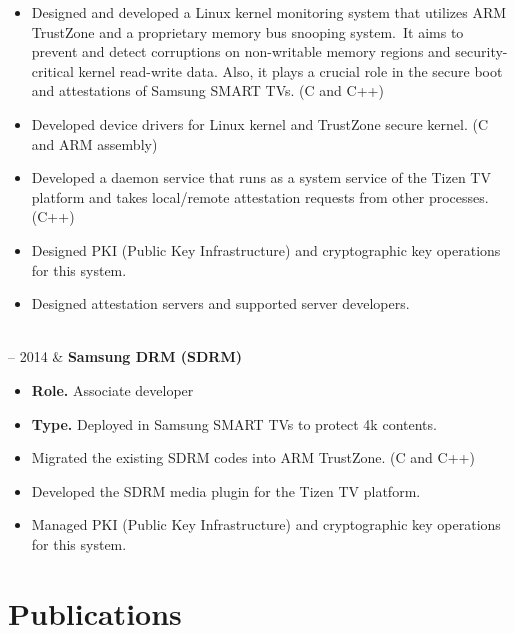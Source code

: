 \documentclass[10pt, a4paper]{article}
\newcommand{\Duration}[2]{\fontsize{9pt}{0}\selectfont #1 -- #2}
\begin{document}
\begin{EntriesTable}
\begin{itemize}
    \item Designed and developed a Linux kernel monitoring system that utilizes ARM TrustZone and a proprietary memory bus snooping system.\
      It aims to prevent and detect corruptions on non-writable memory regions and security-critical kernel read-write data. Also, it plays a crucial role in the secure boot and attestations of Samsung SMART TVs. (C and C++)
    \item Developed device drivers for Linux kernel and TrustZone secure kernel. (C and ARM assembly)
    \item Developed a daemon service that runs as a system service of the Tizen TV platform and takes local/remote attestation requests from other processes. (C++)
    \item Designed PKI (Public Key Infrastructure) and cryptographic key operations for this system.
    \item Designed attestation servers and supported server developers.
  \end{itemize}
  \\
  \Duration{2013}{2014}  &
  \textbf{Samsung DRM (SDRM)}
  \begin{itemize}
    \item \textbf{Role.} Associate developer
    \item \textbf{Type.} Deployed in Samsung SMART TVs to protect 4k contents.
    \item Migrated the existing SDRM codes into ARM TrustZone. (C and C++)
    \item Developed the SDRM media plugin for the Tizen TV platform.
    \item Managed PKI (Public Key Infrastructure) and cryptographic key operations for this system.
  \end{itemize}
\end{EntriesTable}

\section{Publications}
\end{document}
